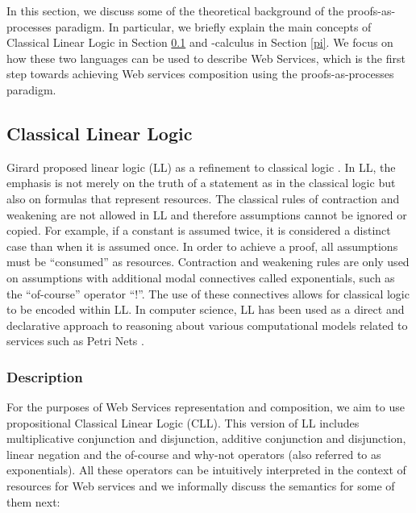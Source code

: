 \documentclass[copyright,creativecommons]{eptcs}
\begin{document}
In this section, we discuss some of the theoretical background of the proofs-as-processes paradigm. In particular, we briefly explain the main concepts of Classical Linear Logic in Section \ref{CLL} and -calculus in Section \ref{pi}. We focus on how these two languages can be used to describe Web Services, which is the first step towards achieving Web services composition using the proofs-as-processes paradigm. 

\subsection{Classical Linear Logic}
\label{CLL}

Girard proposed linear logic (LL) as a refinement to classical logic \cite{girard1995linear}. In LL, the emphasis is not merely on the truth of a statement as in the classical logic but also on formulas that represent resources. The classical rules of contraction and weakening are not allowed in LL and therefore assumptions cannot be ignored or copied. For example, if a constant  is assumed twice, it is considered a distinct case than when it is assumed once. In order to achieve a proof, all assumptions must be ``consumed'' as resources. Contraction and weakening rules are only used on assumptions with additional modal connectives called exponentials, such as the ``of-course'' operator ``!''. The use of these connectives allows for classical logic to be encoded within LL. In computer science, LL has been used as a direct and declarative approach to reasoning about various computational models related to services such as Petri Nets \cite{murata1989petri}.

\subsubsection{Description}
\label{CLLdesc} 

For the purposes of Web Services representation and composition, we aim to use propositional Classical Linear Logic (CLL). This version of LL includes multiplicative conjunction and disjunction, additive conjunction and disjunction, linear negation and the of-course and why-not operators (also referred to as exponentials). All these operators can be intuitively interpreted in the context of resources for Web services and we informally discuss the semantics for some of them next:
\end{document}
